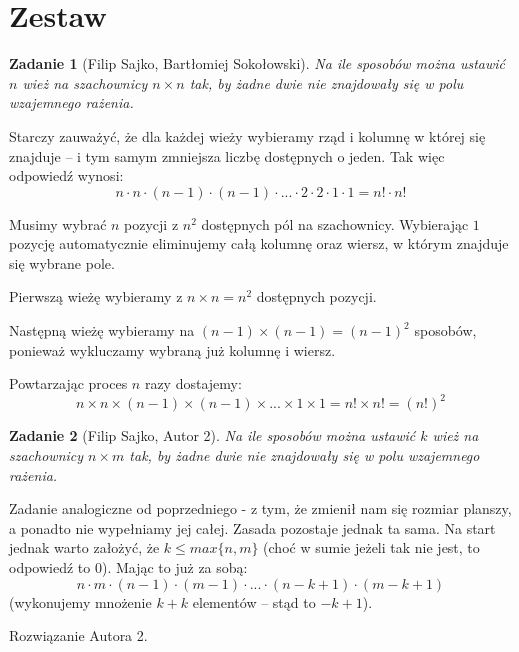 \documentclass{mwart}
\newtheorem{zad}{Zadanie}[section]
\begin{document}
\newpage
\section{Zestaw}          %

\begin{zad}[Filip Sajko, Bartłomiej Sokołowski]
    Na ile sposobów można ustawić $n$ wież na szachownicy
    $n \times n$ tak, by żadne dwie nie znajdowały się w
    polu wzajemnego rażenia.
\end{zad}
\begin{mdframed}
    Starczy zauważyć, że dla każdej wieży wybieramy rząd i kolumnę
    w której się znajduje -- i tym samym zmniejsza liczbę dostępnych
    o jeden. Tak więc odpowiedź wynosi: \[n \cdot n \cdot (n-1) \cdot
        (n-1) \cdot ... \cdot 2 \cdot 2 \cdot 1 \cdot 1 =  n! \cdot n!\]
\end{mdframed}
\begin{mdframed}
    Musimy wybrać $n$ pozycji z $n^2$ dostępnych pól na szachownicy. Wybierając
    $1$ pozycję automatycznie eliminujemy całą kolumnę oraz wiersz, w którym znajduje się wybrane pole.
    \item Pierwszą wieżę wybieramy z $n \times n = n^2$ dostępnych pozycji.
    \item Następną wieżę wybieramy na $(n-1) \times (n-1) = (n-1)^2$ sposobów, ponieważ wykluczamy wybraną już kolumnę i wiersz.
    \item Powtarzając proces $n$ razy dostajemy:
    \[n \times n \times (n-1) \times (n - 1) \times ... \times 1 \times 1 = n! \times n! = (n!)^2\]
\end{mdframed}




\begin{zad}[Filip Sajko, Autor 2]
    Na ile sposobów można ustawić $k$ wież na szachownicy $n \times m$
    tak, by żadne dwie nie znajdowały się w polu wzajemnego rażenia.
\end{zad}
\begin{mdframed}
    Zadanie analogiczne od poprzedniego - z tym, że zmienił nam się
    rozmiar planszy, a ponadto nie wypełniamy jej całej. Zasada
    pozostaje jednak ta sama. Na start jednak warto założyć, że
    $k \leq max\{n, m\}$ (choć w sumie jeżeli tak nie jest, to
    odpowiedź to 0). Mając to już za sobą:
    \[n \cdot m \cdot (n-1) \cdot (m-1) \cdot ... \cdot (n - k +1) \cdot (m -k +1)\]
    (wykonujemy mnożenie $k + k$ elementów -- stąd to $-k + 1$).
\end{mdframed}
\begin{mdframed}
    Rozwiązanie Autora 2.
\end{mdframed}
\end{document}
